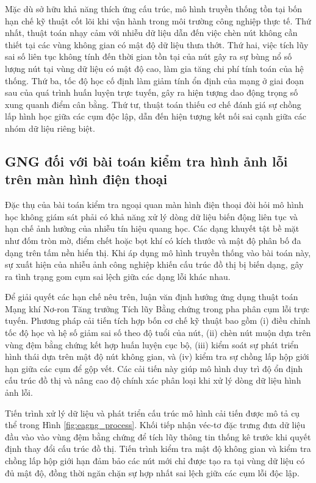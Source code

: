 Mặc dù sở hữu khả năng thích ứng cấu trúc, mô hình truyền thống tồn tại bốn hạn chế kỹ thuật cốt lõi khi vận hành trong môi trường công nghiệp thực tế. Thứ nhất, thuật toán nhạy cảm với nhiễu dữ liệu dẫn đến việc chèn nút không cần thiết tại các vùng không gian có mật độ dữ liệu thưa thớt. Thứ hai, việc tích lũy sai số liên tục không tính đến thời gian tồn tại của nút gây ra sự bùng nổ số lượng nút tại vùng dữ liệu có mật độ cao, làm gia tăng chi phí tính toán của hệ thống. Thứ ba, tốc độ học cố định làm giảm tính ổn định của mạng ở giai đoạn sau của quá trình huấn luyện trực tuyến, gây ra hiện tượng dao động trọng số xung quanh điểm cân bằng. Thứ tư, thuật toán thiếu cơ chế đánh giá sự chồng lấp hình học giữa các cụm độc lập, dẫn đến hiện tượng kết nối sai cạnh giữa các nhóm dữ liệu riêng biệt.

\subsection{GNG đối với bài toán kiểm tra hình ảnh lỗi trên màn hình điện thoại}

Đặc thụ của bài toán kiểm tra ngoại quan màn hình điện thoại đòi hỏi mô hình học không giám sát phải có khả năng xử lý dòng dữ liệu biến động liên tục và hạn chế ảnh hưởng của nhiễu tín hiệu quang học. Các dạng khuyết tật bề mặt như đốm tròn mờ, điểm chết hoặc bọt khí có kích thước và mật độ phân bố đa dạng trên tấm nền hiển thị. Khi áp dụng mô hình truyền thống vào bài toán này, sự xuất hiện của nhiễu ảnh công nghiệp khiến cấu trúc đồ thị bị biến dạng, gây ra tình trạng gom cụm sai lệch giữa các dạng lỗi khác nhau.

Để giải quyết các hạn chế nêu trên, luận văn định hướng ứng dụng thuật toán Mạng khí Nơ-ron Tăng trưởng Tích lũy Bằng chứng trong pha phân cụm lỗi trực tuyến. Phương pháp cải tiến tích hợp bốn cơ chế kỹ thuật bao gồm (i) điều chỉnh tốc độ học và hệ số giảm sai số theo độ tuổi của nút, (ii) chèn nút muộn dựa trên vùng đệm bằng chứng kết hợp huấn luyện cục bộ, (iii) kiểm soát sự phát triển hình thái dựa trên mật độ nút không gian, và (iv) kiểm tra sự chồng lấp hộp giới hạn giữa các cụm để gộp vết. Các cải tiến này giúp mô hình duy trì độ ổn định cấu trúc đồ thị và nâng cao độ chính xác phân loại khi xử lý dòng dữ liệu hình ảnh lỗi.

Tiến trình xử lý dữ liệu và phát triển cấu trúc mô hình cải tiến được mô tả cụ thể trong Hình \ref{fig:eagng_process}. Khối tiếp nhận véc-tơ đặc trưng đưa dữ liệu đầu vào vào vùng đệm bằng chứng để tích lũy thông tin thống kê trước khi quyết định thay đổi cấu trúc đồ thị. Tiến trình kiểm tra mật độ không gian và kiểm tra chồng lấp hộp giới hạn đảm bảo các nút mới chỉ được tạo ra tại vùng dữ liệu có đủ mật độ, đồng thời ngăn chặn sự hợp nhất sai lệch giữa các cụm lỗi độc lập.

